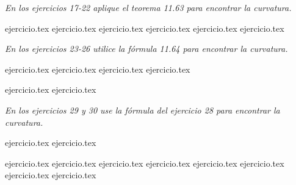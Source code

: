 \vspace{0.3cm}
\noindent\textit{En los ejercicios 17-22 aplique el teorema 11.63 para encontrar la curvatura.}

\begin{enumerate}
    \setcounter{enumi}{16}
    {ejercicio.tex}
{ejercicio.tex}
{ejercicio.tex}
{ejercicio.tex}
{ejercicio.tex}
{ejercicio.tex}
\end{enumerate}

\vspace{0.3cm}
\noindent\textit{En los ejercicios 23-26 utilice la fórmula 11.64 para encontrar la curvatura.}

\begin{enumerate}
    \setcounter{enumi}{22}
    {ejercicio.tex}
{ejercicio.tex}
{ejercicio.tex}
{ejercicio.tex}
\end{enumerate}

\vspace{0.3cm}
\begin{enumerate}
    \setcounter{enumi}{26}
    {ejercicio.tex}
{ejercicio.tex}
\end{enumerate}

\vspace{0.3cm}
\noindent\textit{En los ejercicios 29 y 30 use la fórmula del ejercicio 28 para encontrar la curvatura.}

\begin{enumerate}
    \setcounter{enumi}{28}
    {ejercicio.tex}
{ejercicio.tex}
\end{enumerate}

\vspace{0.3cm}
\begin{enumerate}
    \setcounter{enumi}{30}
    {ejercicio.tex}
{ejercicio.tex}
{ejercicio.tex}
{ejercicio.tex}
{ejercicio.tex}
{ejercicio.tex}
{ejercicio.tex}
{ejercicio.tex}
\end{enumerate}
